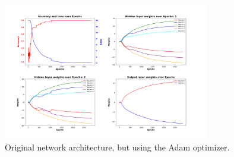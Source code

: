 \documentclass{article}
\begin{document}
    \begin{figure}
        \centering
        \includegraphics[width=0.8\textwidth]{images/plt-06}
        \caption{Original network architecture, but using the Adam optimizer.}
        \label{fig:9}
    \end{figure}

    \printbibliography
\end{document}
